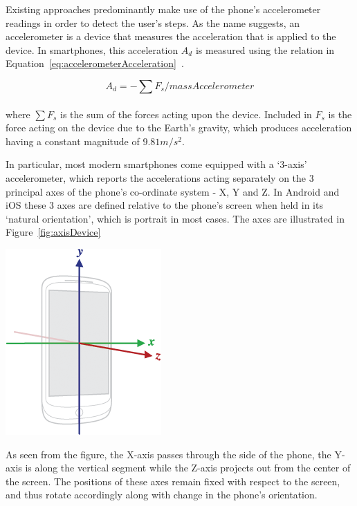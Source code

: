 \documentclass[12pt,a4paper,notitlepage]{report}
\begin{document}
Existing approaches predominantly make use of the phone's accelerometer readings in order to detect the user's steps. As the name suggests, an accelerometer is a device that measures the acceleration that is applied to the device. In smartphones, this acceleration $A_{d}$ is measured using the relation in 
Equation~\ref{eq:accelerometerAcceleration}~\cite{accelerometerAcceleration}.  

\begin{equation}\label{eq:accelerometerAcceleration}
A_{d} = - \sum F_{s}/massAccelerometer
\end{equation}
\\
where $\sum F_{s}$ is the sum of the forces acting upon the device. Included in $F_{s}$ is the force acting on the device due to the Earth's gravity, which produces acceleration having a constant magnitude of $9.81 m/s^2$. 

In particular, most modern smartphones come equipped with a `3-axis' accelerometer, which reports the accelerations acting separately on the 3 principal axes of the phone's co-ordinate system - X, Y and Z. In Android and iOS these 3 axes are defined relative to the phone's screen when held in its `natural orientation', which is portrait in most cases. The axes are illustrated in Figure~\ref{fig:axisDevice}

\begin{center}
\includegraphics[scale=0.5]{images/axisDevice.png}
\label{fig:axisDevice}
\end{center}

As seen from the figure, the X-axis passes through the side of the phone, the Y-axis is along the vertical segment while the Z-axis projects out from the center of the screen. The positions of these axes remain fixed with respect to the screen, and thus rotate accordingly along with change in the phone's orientation. 
\end{document}
